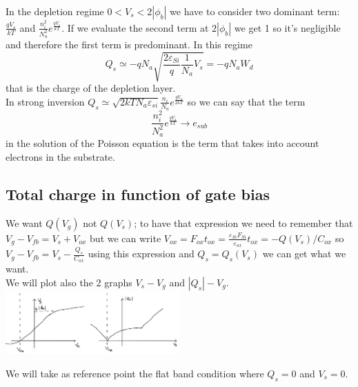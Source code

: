 \vspace{5mm}
In the depletion regime $0<V_s<2|\phi_b|$ we have to consider two dominant term: $\frac{qV_s}{kT}$ and $\frac{n_i^2}{N_a^2}e^{\frac{qV_s}{kT}}$. If we evaluate the second term at $2|\phi_b|$ we get 1 so it's negligible and therefore the first term is predominant. In this regime
\begin{equation}
Q_s\simeq -qN_a\sqrt{\frac{2\varepsilon_{Si}}{q}\frac{1}{N_a}V_s}=-qN_aW_d
\end{equation}
that is the charge of the depletion layer.\\

\vspace{5mm}
In strong inversion $Q_s\simeq \sqrt{2kTN_a\varepsilon_{si}}\frac{n_i}{N_a}e^{\frac{qV_s}{2kT}}$ so we can say that the term
\begin{equation}
\frac{n_i^2}{N_a^2}e^{\frac{qV_s}{kT}}\rightarrow e_{sub}
\end{equation}
in the solution of the Poisson equation is the term that takes into account electrons in the substrate.\\

\subsection{Total charge in function of gate bias}
We want $Q(V_g)$ not $Q(V_s)$; to have that expression we need to remember that $V_g-V_{fb}=V_s+V_{ox}$ but we can write $V_{ox}=F_{ox}t_{ox}=\frac{\varepsilon_{Si}F_{Si}}{\varepsilon_{ox}}t_{ox}=-Q(V_s)/C_{ox}$ so $V_g-V_{fb}=V_s-\frac{Q_s}{C_{ox}}$ using this expression and $Q_s=Q_s(V_s)$ we can get what we want.\\
We will plot also the 2 graphs $V_s-V_g$ and $|Q_s|-V_g$.\\

\centering
\includegraphics[width=0.5\textwidth]{qvs.png}\\
\raggedright


We will take as reference point the flat band condition where $Q_s=0$ and $V_s=0$.\\

